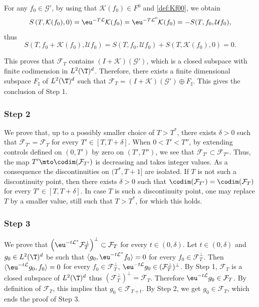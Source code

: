 For any $f_0 \in \mathcal{G}'$, by using that $\mathcal{K}(f_0) \in F^0$ and \eqref{def:Kf00}, we obtain\vspace*{-2pt}
\[
S\left(T,\mathcal{K}(f_0),0\right)=
\eu^{-T\mathcal{L}} \mathcal{K}(f_0) =
\eu^{-T\mathcal{L}^0} \mathcal{K}(f_0) =
- S(T,f_0,\mathcal{U} f_0),
\]
thus\vspace*{-3pt}
\[
S\left(T,f_0+\mathcal{K}(f_0),\mathcal{U} f_0\right)=S\left(T,f_0,\mathcal{U} f_0 \right)+ S\left(T,\mathcal{K}(f_0),0\right)=0.
\]

This proves that $\mathcal{F}_{T}$ contains $(I+\mathcal{K})(\mathcal{G}')$,
which is a closed subspace with finite codimension in $L^2(\T)^d$. Therefore, there exists a finite dimensional subspace $F_\sharp$ of $L^2(\T)^d$ such that
$\mathcal{F}_{T} = (I+\mathcal{K})(\mathcal{G}') \oplus F_\sharp$. This gives the conclusion of Step 1.

\subsubsection*{Step 2}
We prove that, up to a possibly smaller choice of $T>T^\ast$, there exists $\delta>0$ such that $\mathcal{F}_{T'}=\mathcal{F}_{T}$ for every $T'\in[T,T+\delta]$.
When $0<T'<T''$, by extending controls defined on $(0,T')$ by zero on $(T',T'')$, we see that $\mathcal{F}_{T'} \subset \mathcal{F}_{T''}$. Thus, the map $T' \mto \codim(\mathcal{F}_{T'})$ is decreasing and takes integer values. As a consequence the discontinuities on $(T^\ast,T+1]$ are isolated. If $T$ is not such a discontinuity point, then there exists $\delta>0$ such that $\codim(\mathcal{F}_{T'})=\codim(\mathcal{F}_{T})$ for every $T'\in[T,T+\delta]$. In case $T$ is such a discontinuity point, one may replace $T$ by a smaller value, still such that $T>T^\ast$, for which this holds.

\subsubsection*{Step 3}
We prove that $\left(\eu^{-t {\mathcal{L}^*}} \mathcal{F}_{T}^{\perp} \right)^\perp \subset \mathcal{F}_{T}$ for every $t\in(0,\delta)$. Let $t \in (0,\delta)$ and $g_0 \in L^2(\T)^d$ be such that $\langle g_0, \eu^{-t {\mathcal{L}^*}} f_0 \rangle = 0$ for every $f_0 \in \mathcal{F}_{T}^{\perp}$. Then $\langle \eu^{-t {\mathcal{L}}} g_0, f_0 \rangle = 0$ for every $f_0 \in \mathcal{F}_{T}^{\perp}$, \ie
$\eu^{-t {\mathcal{L}}} g_0 \in (\mathcal{F}_{T}^{\perp})^\perp$.
By Step 1, $\mathcal{F}_{T}$ is a closed subspace of $L^2(\T)^d$ thus $(\mathcal{F}_{T}^{\perp})^\perp = \mathcal{F}_{T}$. Therefore $\eu^{-t {\mathcal{L}}} g_0 \in \mathcal{F}_{T}$. By definition of $\mathcal{F}_T$, this implies that $g_0 \in \mathcal{F}_{T+t}$. By Step 2, we get $g_0 \in \mathcal{F}_T$, which ends the proof of Step 3.

